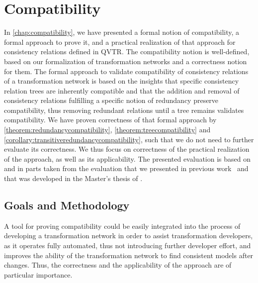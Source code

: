 \section{Compatibility}
\label{chap:correctness_evaluation:compatibility}

In \autoref{chap:compatibility}, we have presented a formal notion of compatibility, a formal approach to prove it, and a practical realization of that approach for consistency relations defined in \gls{QVTR}.
The compatibility notion is well-defined, based on our formalization of transformation networks and a correctness notion for them.
The formal approach to validate compatibility of consistency relations of a transformation network is based on the insights that specific consistency relation trees are inherently compatible and that the addition and removal of consistency relations fulfilling a specific notion of redundancy preserve compatibility, thus removing redundant relations until a tree remains validates compatibility.
We have proven correctness of that formal approach by \autoref{theorem:redundancycompatibility}, \autoref{theorem:treecompatibility} and \autoref{corollary:transitiveredundancycompatibility}, such that we do not need to further evaluate its correctness.
We thus focus on correctness of the practical realization of the approach, as well as its applicability.
The presented evaluation is based on and in parts taken from the evaluation that we presented in previous work~ and that was developed in the Master's thesis of \textcite{pepin2019ma}.


\subsection{Goals and Methodology}

A tool for proving compatibility could be easily integrated into the process of developing a transformation network in order to assist transformation developers, as it operates fully automated, thus not introducing further developer effort, and improves the ability of the transformation network to find consistent models after changes.
Thus, the correctness and the applicability of the approach are of particular importance.

